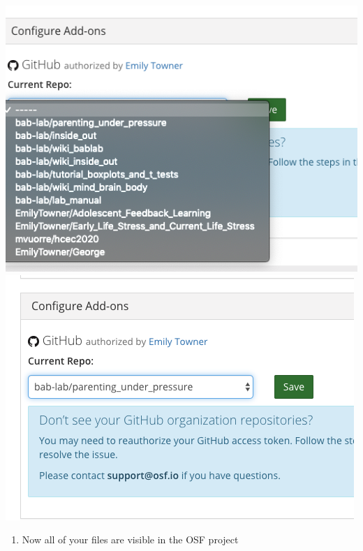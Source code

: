 \documentclass[]{book}
\providecommand{\tightlist}{%
  \setlength{\itemsep}{0pt}\setlength{\parskip}{0pt}}
\begin{document}
\includegraphics{images/research_protocols/osf/7.png}
\includegraphics{images/research_protocols/osf/8.png}

\begin{enumerate}
\def\labelenumi{\arabic{enumi}.}
\setcounter{enumi}{6}
\tightlist
\item
  Now all of your files are visible in the OSF project
\end{enumerate}
\end{document}
